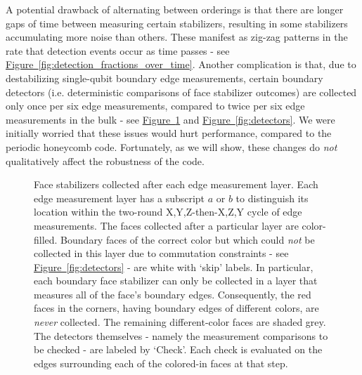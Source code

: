 \documentclass[onecolumn,unpublished,a4paper]{quantumarticle}
\theoremstyle{definition}
\theoremstyle{definition}
\theoremstyle{definition}
\newcommand{\fig}[1]{\hyperref[fig:#1]{Figure~\ref*{fig:#1}}}
\begin{document}
A potential drawback of alternating between orderings is that there are longer gaps of time between measuring certain stabilizers, resulting in some stabilizers accumulating more noise than others.
These manifest as zig-zag patterns in the rate that detection events occur as time passes - see \fig{detection_fractions_over_time}.
Another complication is that, due to destabilizing single-qubit boundary edge measurements, certain boundary detectors (i.e. deterministic comparisons of face stabilizer outcomes) are collected only once per six edge measurements, compared to twice per six edge measurements in the bulk - see \fig{parity_check_cycle} and \fig{detectors}.
We were initially worried that these issues would hurt performance, compared to the periodic honeycomb code.
Fortunately, as we will show, these changes do \emph{not} qualitatively affect the robustness of the code.

\begin{figure}[ht!]
    \centering
    \caption{
    Face stabilizers collected after each edge measurement layer.  
    Each edge measurement layer has a subscript $a$ or $b$ to distinguish its location within the two-round X,Y,Z-then-X,Z,Y cycle of edge measurements. 
    The faces collected after a particular layer are color-filled.  
    Boundary faces of the correct color but which could \emph{not} be collected in this layer due to commutation constraints - see \fig{detectors} - are white with `skip' labels.  
    In particular, each boundary face stabilizer can only be collected in a layer that measures all of the face's boundary edges.
    Consequently, the red faces in the corners, having boundary edges of different colors, are \emph{never} collected.  
    The remaining different-color faces are shaded grey.  
    The detectors themselves - namely the measurement comparisons to be checked - are labeled by `Check'.
    Each check is evaluated on the edges surrounding each of the colored-in faces at that step.
    }
    \label{fig:parity_check_cycle}
\end{figure}
\end{document}
